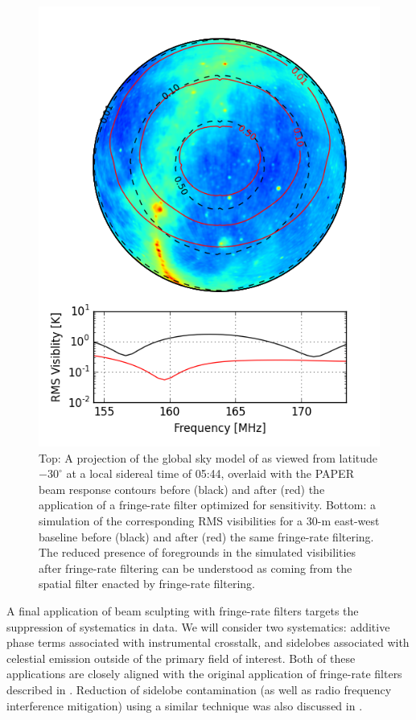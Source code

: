 \documentclass[twocolumn,apj,numberedappendix]{emulateapj}
\begin{document}
\begin{figure}\centering
\includegraphics[width=.9\columnwidth]{plots/gsm.png}
\caption{
Top: A projection of the global sky model of \citet{deoliveiracosta_et_al2008} as viewed from
latitude $-30^\circ$ at a local sidereal time of 05:44, overlaid with the 
PAPER beam response contours before (black) and after (red) the application of a fringe-rate filter
optimized for sensitivity.  
Bottom: a simulation of the corresponding RMS visibilities for a 30-m east-west baseline before (black) and
after (red) the same fringe-rate filtering.
The reduced presence of foregrounds in the simulated visibilities after fringe-rate filtering
can be understood as coming from the spatial filter enacted by fringe-rate filtering.
}\label{fig:gsm}
\end{figure}

A final application of beam sculpting with fringe-rate filters targets the suppression of systematics in data.
We will consider two systematics: additive phase terms associated with instrumental crosstalk, and sidelobes
associated with celestial emission outside of the primary field of interest.  Both of these applications are 
closely aligned with the original application of fringe-rate filters described in \citet{parsons_backer2009}. Reduction of sidelobe contamination (as well as radio frequency
interference mitigation) using a similar technique was also discussed in \citet{offringa_et_al2012}.
\end{document}

